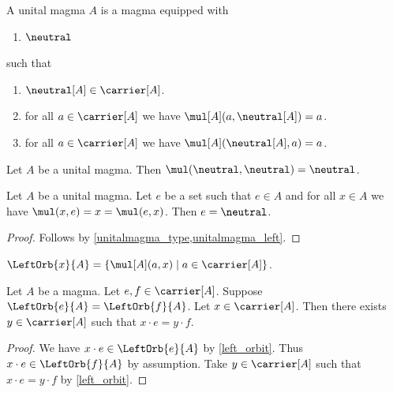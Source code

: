 \begin{struct}\label{unitalmagma}
    A unital magma $A$ is a magma equipped with
    \begin{enumerate}
        \item $\neutral$
    \end{enumerate}
    such that
    \begin{enumerate}
        \item\label{unitalmagma_type} $\neutral[A]\in \carrier[A]$.
        \item\label{unitalmagma_right} for all $a\in \carrier[A]$ we have $\mul[A](a,\neutral[A]) = a$.
        \item\label{unitalmagma_left} for all $a\in \carrier[A]$ we have $\mul[A](\neutral[A], a) = a$.
    \end{enumerate}
\end{struct}

\begin{proposition}\label{unitalmagma_mul_neutral_neutral}
    Let $A$ be a unital magma.
    Then $\mul(\neutral,\neutral) = \neutral$.
\end{proposition}

\begin{proposition}\label{unitalmagma_neutral_unique}
    Let $A$ be a unital magma.
    Let $e$ be a set such that $e\in A$ and for all $x\in A$ we have $\mul(x, e) = x = \mul(e, x)$.
    Then $e = \neutral$.
\end{proposition}
\begin{proof}
    Follows by \cref{unitalmagma_type,unitalmagma_left}.
\end{proof}



\begin{definition}\label{left_orbit}
    $\LeftOrb{x}{A} = \{\mul[A](a,x) \mid a\in\carrier[A] \}$.
\end{definition}

\begin{proposition}\label{eq_left_orbit_witness}
    Let $A$ be a magma.
    Let $e,f\in\carrier[A]$.
    Suppose $\LeftOrb{e}{A} = \LeftOrb{f}{A}$.
    Let $x\in\carrier[A]$.
    Then there exists $y\in\carrier[A]$ such that $x\cdot e = y\cdot f$.
\end{proposition}
\begin{proof}
    We have $x\cdot e\in \LeftOrb{e}{A}$ by \cref{left_orbit}.
    Thus $x\cdot e\in\LeftOrb{f}{A}$ by assumption.
    Take $y\in\carrier[A]$ such that $x\cdot e = y\cdot f$ by \cref{left_orbit}.
\end{proof}
